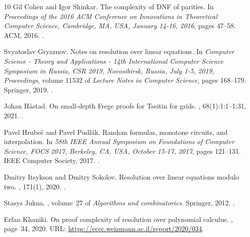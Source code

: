 \documentclass[10pt,a4paper]{article}
\theoremstyle{definition}
\theoremstyle{remark}
\begin{document}
\begin{thebibliography}{10}
Gil Cohen and Igor Shinkar.
\newblock The complexity of {DNF} of parities.
\newblock In {\em Proceedings of the 2016 {ACM} Conference on Innovations in
  Theoretical Computer Science, Cambridge, MA, USA, January 14-16, 2016}, pages
  47--58. {ACM}, 2016.
\newblock \href {https://doi.org/10.1145/2840728.2840734}
  {}.

Svyatoslav Gryaznov.
\newblock Notes on resolution over linear equations.
\newblock In {\em Computer Science - Theory and Applications - 14th
  International Computer Science Symposium in Russia, {CSR} 2019, Novosibirsk,
  Russia, July 1-5, 2019, Proceedings}, volume 11532 of {\em Lecture Notes in
  Computer Science}, pages 168--179. Springer, 2019.
\newblock \href {https://doi.org/10.1007/978-3-030-19955-5\_15}
  {}.

Johan H{\aa}stad.
\newblock On small-depth {F}rege proofs for {T}seitin for grids.
, 68(1):1:1--1:31, 2021.
\newblock \href {https://doi.org/10.1145/3425606} {}.

Pavel Hrube{\v s} and Pavel Pudl{\'{a}}k.
\newblock Random formulas, monotone circuits, and interpolation.
\newblock In {\em 58th {IEEE} Annual Symposium on Foundations of Computer
  Science, {FOCS} 2017, Berkeley, CA, USA, October 15-17, 2017}, pages
  121--131. {IEEE} Computer Society, 2017.
\newblock \href {https://doi.org/10.1109/FOCS.2017.20}
  {}.

Dmitry Itsykson and Dmitry Sokolov.
\newblock Resolution over linear equations modulo two.
, 171(1), 2020.
\newblock \href {https://doi.org/10.1016/j.apal.2019.102722}
  {}.

Stasys Jukna.
, volume~27
  of {\em Algorithms and combinatorics}.
\newblock Springer, 2012.
\newblock \href {https://doi.org/10.1007/978-3-642-24508-4}
  {}.

Erfan Khaniki.
\newblock On proof complexity of resolution over polynomial calculus.
, page~34, 2020.
\newblock URL: \url{https://eccc.weizmann.ac.il/report/2020/034}.


\end{thebibliography}
\end{document}
